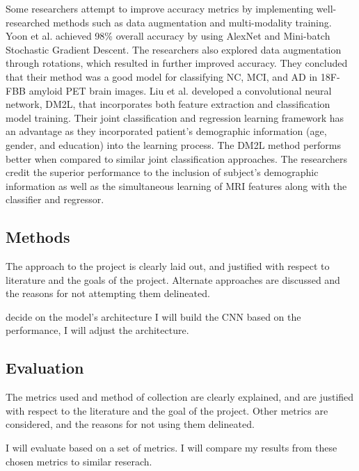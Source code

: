 \documentclass[10pt,twocolumn]{article}
\begin{document}
Some researchers attempt to improve accuracy metrics by implementing well-researched methods such as data augmentation and multi-modality training. Yoon et al. \cite{yoon2018classification} achieved 98\% overall accuracy by using AlexNet and Mini-batch Stochastic Gradient Descent. The researchers also explored data augmentation through rotations, which resulted in further improved accuracy. They concluded that their method was a good model for classifying NC, MCI, and AD in 18F-FBB amyloid PET brain images. Liu et al. \cite{liu2018joint} developed a convolutional neural network, DM2L, that incorporates both feature extraction and classification model training. Their joint classification and regression learning framework has an advantage as they incorporated patient's demographic information (age, gender, and education) into the learning process. The DM2L method performs better when compared to similar joint classification approaches. The researchers credit the superior performance to the inclusion of subject's demographic information as well as the simultaneous learning of MRI features along with the classifier and regressor.



\subsection{Methods}
The approach to the project is clearly laid out, and justified with respect to literature and the goals of the project. Alternate approaches are discussed and the reasons for not attempting them delineated.


decide on the model's architecture 
I will build the CNN 
based on the performance, I will adjust the architecture. 
\subsection{Evaluation}
The metrics used and method of collection are clearly explained, and are justified with respect to the literature and the goal of the project. Other metrics are considered, and the reasons for not using them delineated.



I will evaluate based on a set of metrics. I will compare my results from these chosen metrics to similar reserach. 
\end{document}
